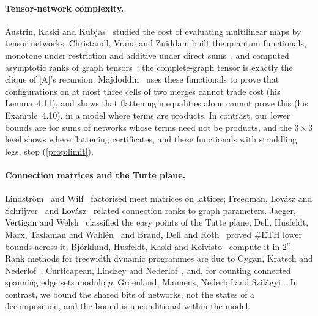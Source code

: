 \documentclass[10pt]{amsart}
\theoremstyle{plain}
\theoremstyle{definition}
\theoremstyle{remark}
\numberwithin{equation}{section}
\newcommand{\A}{\textup{[A]}}
\begin{document}
\paragraph{Tensor-network complexity.} Austrin, Kaski and Kubjas~\cite{AKK22} studied the cost of
evaluating multilinear maps by tensor networks. Christandl, Vrana and Zuiddam built the quantum
functionals, monotone under restriction and additive under direct sums~\cite{CVZ23}, and computed
asymptotic ranks of graph tensors~\cite{CVZ19}; the complete-graph tensor is exactly the clique of
\A's recursion. Majdoddin~\cite{Maj26} uses these functionals to prove that configurations on at most
three cells of two merges cannot trade cost (his Lemma~4.11), and shows that flattening inequalities
alone cannot prove this (his Example~4.10), in a model where terms are products. In contrast, our lower
bounds are for sums of networks whose terms need not be products, and the $3\times3$ level shows where
flattening certificates, and these functionals with straddling legs, stop (\cref{prop:limit}).

\paragraph{Connection matrices and the Tutte plane.} Lindstr\"om~\cite{Lindstrom69} and
Wilf~\cite{Wilf68} factorised meet matrices on lattices; Freedman, Lov\'asz and Schrijver~\cite{FLS07}
and Lov\'asz~\cite{Lovasz12} related connection ranks to graph parameters. Jaeger, Vertigan and
Welsh~\cite{JVW90} classified the easy points of the Tutte plane; Dell, Husfeldt, Marx, Taslaman and
Wahl\'en~\cite{DHMTW14} and Brand, Dell and Roth~\cite{BrandDellRoth19} proved $\#$ETH lower bounds
across it; Bj\"orklund, Husfeldt, Kaski and Koivisto~\cite{BHKK08Tutte} compute it in $2^n$. Rank
methods for treewidth dynamic programmes are due to Cygan, Kratsch and Nederlof~\cite{CKN18},
Curticapean, Lindzey and Nederlof~\cite{CLN18}, and, for counting connected spanning edge sets modulo
$p$, Groenland, Mannens, Nederlof and Szil\'agyi~\cite{GMNS22}. In contrast, we bound the shared bits of
networks, not the states of a decomposition, and the bound is unconditional within the model.
\end{document}
